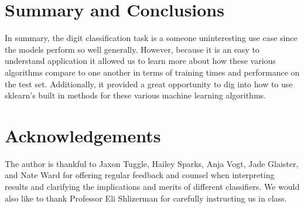 \documentclass[11pt]{amsart}
\begin{document}
\section{Summary and Conclusions}\label{sec:conclusions} 
In summary, the digit classification task is a someone uninteresting use case since the models perform so well generally.
However, because it is an easy to understand application it allowed us to learn more about how these various algorithms compare to one another in terms of training times and performance on the test set.
Additionally, it provided a great opportunity to dig into how to use sklearn's built in methods for these various machine learning algorithms.

\section*{Acknowledgements}

The author is thankful to Jaxon Tuggle, Hailey Sparks, Anja Vogt, Jade Glaister, and Nate Ward for offering regular feedback and counsel when interpreting results and clarifying the implications and merits of different classifiers.
We would also like to thank Professor Eli Shlizerman for carefully instructing us in class.


\end{document}
